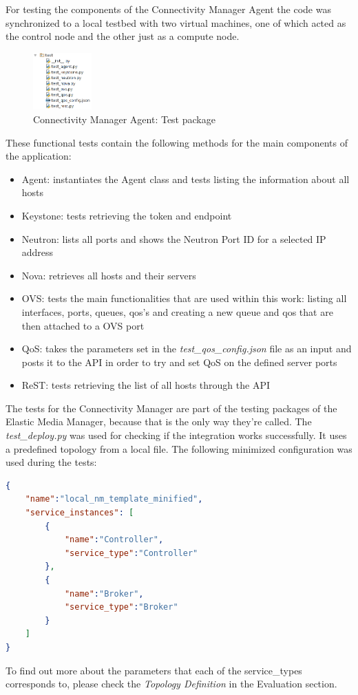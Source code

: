 For testing the components of the Connectivity Manager Agent the code was synchronized to a local testbed with two virtual machines, one of which acted as the control node and the other just as a compute node. 

\begin{figure}[H]
\centering

\includegraphics[width=0.2\textwidth]{images/implementation/cma_tests.png}

\caption{Connectivity Manager Agent: Test package}
\end{figure}

These functional tests contain the following methods for the main components of the application:
\begin{itemize}
\item Agent: instantiates the Agent class and tests listing the information about all hosts
\item Keystone: tests retrieving the token and endpoint
\item Neutron: lists all ports and shows the Neutron Port ID for a selected IP address
\item Nova: retrieves all hosts and their servers
\item OVS: tests the main functionalities that are used within this work: listing all interfaces, ports, queues, qos's and creating a new queue and qos that are then attached to a OVS port
\item QoS: takes the parameters set in the \textit{test\_qos\_config.json} file as an input and posts it to the API in order to try and set QoS on the defined server ports
\item ReST: tests retrieving the list of all hosts through the API
\end{itemize}

The tests for the Connectivity Manager are part of the testing packages of the Elastic Media Manager, because that is the only way they're called. The \textit{test\_deploy.py} was used for checking if the integration works successfully.  It uses a predefined topology from a local file. The following minimized configuration was used during the tests:
\begin{lstlisting}[language=json]
{
    "name":"local_nm_template_minified",
    "service_instances": [
        {
            "name":"Controller",
            "service_type":"Controller"
        },
        {
            "name":"Broker",
            "service_type":"Broker"
        }
    ]
}
\end{lstlisting}

To find out more about the parameters that each of the service\_types corresponds to, please check the \textit{Topology Definition} %
in the Evaluation section.